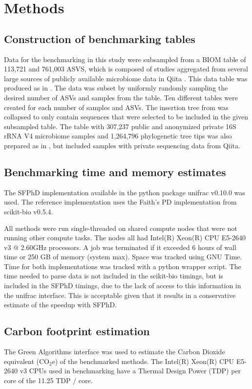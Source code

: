 \section{Methods}
\subsection{Construction of benchmarking tables}
Data for the benchmarking in this study were subsampled from a BIOM table of 113,721 and 761,003 ASVS, which is composed of studies aggregated from several large sources of publicly available microbiome data in Qiita \cite{Amir2017-sk,Gonzalez2018-ez}. This data table was produced as in \cite{McDonald2018-qq}. The data was subset by uniformly randomly sampling the desired number of ASVs and samples from the table. Ten different tables were created for each number of samples and ASVs. The insertion tree from \cite{McDonald2018-qq} was collapsed to only contain sequences that were selected to be included in the given subsampled table.
The table with 307,237 public and anonymized private 16S rRNA V4 microbiome samples and 1,264,796 phylogenetic tree tips was also prepared as in \cite{McDonald2018-qq}, but included samples with private sequencing data from Qiita.

\subsection{Benchmarking time and memory estimates
}

The SFPhD implementation available in the python package unifrac v0.10.0 was used. The reference implementation uses the Faith's PD implementation from scikit-bio v0.5.4.

All methods were run single-threaded on shared compute nodes that were not running other compute tasks. The nodes all had Intel(R) Xeon(R) CPU E5-2640 v3 @ 2.60GHz processors. A job was terminated if it exceeded 6 hours of wall time or 250 GB of memory (system max). Space was tracked using GNU Time. Time for both implementations was tracked with a python wrapper script. The time needed to parse data is not included in the scikit-bio timings, but is included in the SFPhD timings, due to the lack of access to this information in the unifrac interface. This is acceptable given that it results in a conservative estimate of the speedup with SFPhD.

\subsection{Carbon footprint estimation}
The Green Algorithms interface \cite{Lannelongue2021-vg} was used to estimate the Carbon Dioxide equivalent ($\text{CO}_2\text{e}$) of the benchmarked methods. The Intel(R) Xeon(R) CPU E5-2640 v3 CPUs used in benchmarking have a Thermal Design Power (TDP) per core of the  11.25 TDP / core.

